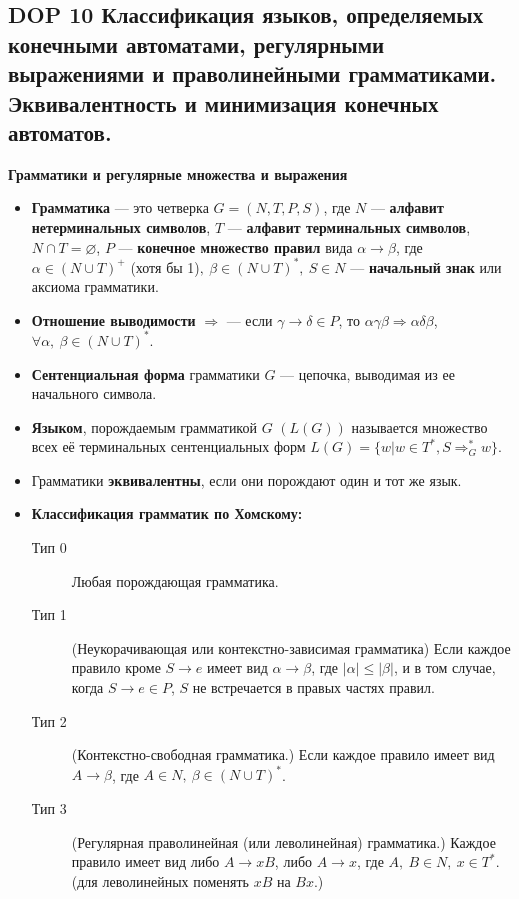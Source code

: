 \subsection{DOP 10 Классификация  языков,  определяемых  конечными  автоматами,  регулярными  выражениями  и праволинейными грамматиками. Эквивалентность и минимизация конечных автоматов.}

\textbf{Грамматики и регулярные множества и выражения}
\begin{itemize}
    \item \textbf{Грамматика} --- это четверка $G = (N, T, P, S)$, где $N$ --- \textbf{алфавит нетерминальных символов}, $T$ --- \textbf{алфавит терминальных символов}, $N \cap T = \varnothing$, $P$ --- \textbf{конечное множество правил} вида $\alpha \rightarrow \beta$, где $\alpha \in (N \cup T)^+$ (хотя бы 1)$,~\beta \in (N \cup T)^\ast,~S \in N$ --- \textbf{начальный знак} или аксиома грамматики.
    \item \textbf{Отношение выводимости} $\Rightarrow$ --- если $\gamma \rightarrow \delta \in P$, то $\alpha \gamma \beta \Rightarrow \alpha \delta \beta$, $\forall \alpha,~\beta \in (N \cup T)^\ast$.
    \item \textbf{Сентенциальная форма} грамматики $G$ --- цепочка, выводимая из ее начального символа.
    \item \textbf{Языком}, порождаемым грамматикой $G$ $(L(G))$ называется множество всех её терминальных сентенциальных форм $L(G) = \{ w |w \in T^\ast , S \Rightarrow^{\ast}_G w\}$.
    \item Грамматики \textbf{эквивалентны}, если они порождают один и тот же язык.
    \item \textbf{Классификация грамматик по Хомскому:}
    \begin{description}
        \item[Тип 0] Любая порождающая грамматика.
        \item[Тип 1] (Неукорачивающая или контекстно-зависимая грамматика) Если каждое правило кроме $S \rightarrow e$ имеет вид $\alpha \rightarrow \beta$, где $|\alpha| \leqslant |\beta|$, и в том случае, когда $S \rightarrow e \in P$, $S$ не встречается в правых частях правил.
        \item[Тип 2] (Контекстно-свободная грамматика.) Если каждое правило имеет вид $A \rightarrow \beta$, где $A \in N,~\beta \in (N \cup T)^\ast$.
        \item[Тип 3] (Регулярная праволинейная (или леволинейная) грамматика.) Каждое правило имеет вид либо $A \rightarrow xB$, либо $A \rightarrow x$, где $A,~B \in N,~x \in T^\ast$. (для леволинейных поменять $xB$ на $Bx$.)

\end{description}
\end{itemize}

